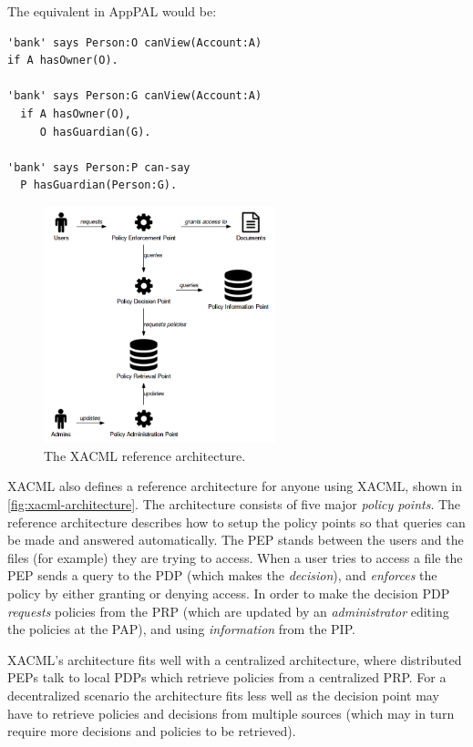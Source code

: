 \documentclass[thesis.tex]{subfiles}
\begin{document}
The equivalent in AppPAL would be:

\begin{lstlisting}
'bank' says Person:O canView(Account:A)
if A hasOwner(O).

'bank' says Person:G canView(Account:A)
  if A hasOwner(O),
     O hasGuardian(G).

'bank' says Person:P can-say
  P hasGuardian(Person:G).
\end{lstlisting}

\begin{figure}
  \centering
  \includegraphics[width=0.6\textwidth]{figures/xacml-architecture.png}
  \caption{The XACML reference architecture.}
  \label{fig:xacml-architecture}
\end{figure}

XACML also defines a reference architecture for anyone using XACML, shown in
\autoref{fig:xacml-architecture}. The architecture consists of five major
\emph{policy points}. The reference architecture describes how to setup the
policy points so that queries can be made and answered automatically. The PEP
stands between the users and the files (for example) they are trying to access.
When a user tries to access a file the PEP sends a query to the PDP (which makes
the \emph{decision}), and \emph{enforces} the policy by either granting or
denying access. In order to make the decision PDP \emph{requests} policies from
the PRP (which are updated by an \emph{administrator} editing the policies at
the PAP), and using \emph{information} from the PIP.

XACML's architecture fits well with a centralized architecture, where
distributed PEPs talk to local PDPs which retrieve policies from a centralized
PRP. For a decentralized scenario the architecture fits less well as the
decision point may have to retrieve policies and decisions from multiple sources
(which may in turn require more decisions and policies to be retrieved).
\end{document}
